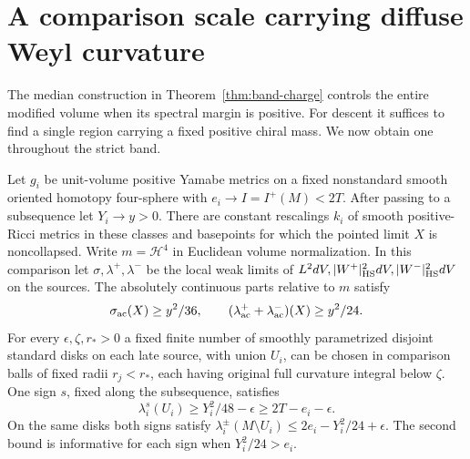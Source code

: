 \section{A comparison scale carrying diffuse Weyl curvature}
\label{sec:spectral-windows}

The median construction in Theorem~\ref{thm:band-charge} controls
the entire modified volume when its spectral margin is positive.
For descent it suffices to find a single region carrying a fixed
positive chiral mass. We now obtain one throughout the strict band.

\begin{theorem}\label{thm:spectral-windows}
Let \(g_i\) be unit-volume positive Yamabe metrics on a fixed
nonstandard smooth oriented homotopy four-sphere with
\(e_i\to I=I^+(M)<2T\). After passing to a subsequence let
\(Y_i\to y>0\). There are constant rescalings \(k_i\) of smooth
positive-Ricci metrics in these classes and basepoints for which
the pointed limit \(X\) is noncollapsed. Write \(m=\mathcal H^4\)
in Euclidean volume normalization. In this comparison let
\(\sigma,\lambda^+,\lambda^-\) be the local weak limits of
\(L^2dV,|W^+|^2_{\rm HS}dV,|W^-|^2_{\rm HS}dV\) on the sources.
The absolutely continuous parts relative to \(m\) satisfy
\[
 \sigma_{\rm ac}(X)\ge y^2/36,\qquad
 (\lambda^+_{\rm ac}+\lambda^-_{\rm ac})(X)\ge y^2/24 .
\]
For every \(\epsilon,\zeta,r_*>0\) a fixed finite number of
smoothly parametrized disjoint standard disks on each late source,
with union \(U_i\), can be chosen in comparison balls of fixed radii
\(r_j<r_*\), each having original full curvature integral below
\(\zeta\). One sign \(s\), fixed along the subsequence, satisfies
\[
 \lambda_i^s(U_i)\ge Y_i^2/48-\epsilon
                  \ge 2T-e_i-\epsilon.
\]
On the same disks both signs satisfy
\(\lambda_i^\pm(M\setminus U_i)\le 2e_i-Y_i^2/24+\epsilon\).
The second bound is informative for each sign when \(Y_i^2/24>e_i\).
\end{theorem}

